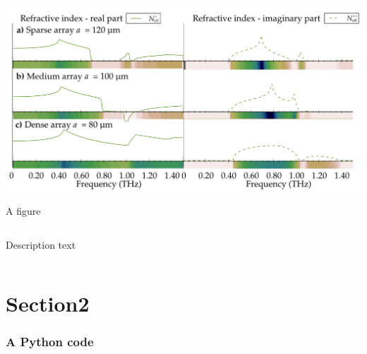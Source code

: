 \documentclass[t]{beamer} \usepackage[czech]{babel} \usepackage[utf8]{inputenc} \usetheme{Frankfurt} %
\begin{document}
\begin{frame}{}	%
\includegraphics[width=1.\framewidth]{../img/ERods_sketch_of_separate_spectra_to_continuous_scan.pdf}
\end{frame} 		%


\begin{frame}{A figure}	%

\begin{columns}[T] %
\begin{column}{.5\textwidth}
\vspace{3mm}
\noindent Description text
\end{column}%
\begin{column}{.5\textwidth}
\end{column}%
\end{columns}

\end{frame} 		%

\section{Section2}
\begin{frame}[fragile] \frametitle{A Python code}%
\begin{scriptsize}
\end{scriptsize}
\end{frame}
\end{document}
